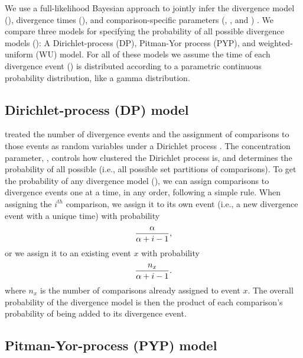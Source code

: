 \documentclass[letterpaper,12pt]{article}
\begin{document}
We use a full-likelihood Bayesian approach to jointly infer
the divergence model (\etimesets), divergence times
(\etimes),
and comparison-specific parameters (\epopsize, \murate, and \gfreq)
\citep{Oaks2018ecoevolity,Oaks2019codemog}.
We compare three models for specifying the probability of all
possible divergence models (\etimesets):
A Dirichlet-process (DP), Pitman-Yor process (PYP), and
weighted-uniform (WU) model.
For all of these models we assume the time of each divergence event (\etime) is
distributed according to a parametric continuous probability distribution, like
a gamma distribution.

\subsection{Dirichlet-process (DP) model}

\begin{linenomath}
\citet{Oaks2018ecoevolity} treated the number of divergence events and the
assignment of comparisons to those events as random variables under a Dirichlet
process \citep{Ferguson1973, Antoniak1974}.
The concentration parameter, \concentration, controls how clustered the
Dirichlet process is, and determines the probability of all possible \etimesets
(i.e., all possible set partitions of \ncomparisons comparisons).
To get the probability of any divergence model (\etimesets), we can assign
comparisons to divergence events one at a time, in any order, following a
simple rule.
When assigning the $i^{th}$ comparison, we assign it to its own event
(i.e., a new divergence event with a unique time) with probability
\begin{equation}
    \frac{\alpha}{\alpha + i - 1},
    \label{eq:dpnewcat}
\end{equation}
or we assign it to an existing event $x$ with probability
\begin{equation}
    \frac{n_x}{\alpha + i - 1}.
    \label{eq:dpexistingcat}
\end{equation}
where $n_x$ is the number of comparisons already assigned to event $x$.
The overall probability of the divergence model is then the product of each
comparison's probability of being added to its divergence event.
\end{linenomath}

\subsection{Pitman-Yor-process (PYP) model}
\end{document}

